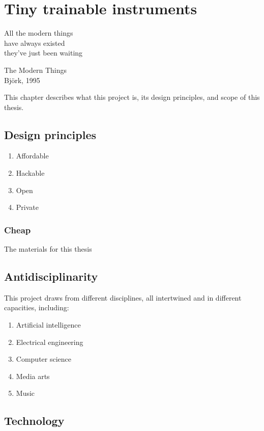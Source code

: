 \chapter{Tiny trainable instruments}

\epigraph{All the modern things \\ have always existed \\ they've just been waiting}{The Modern Things \\ Björk, 1995}

This chapter describes what this project is, its design principles, and scope of this thesis.

\section{Design principles}

\begin{enumerate}
  \item Affordable
  \item Hackable
  \item Open
  \item Private
\end{enumerate}

\subsection{Cheap}

The materials for this thesis 

\section{Antidisciplinarity}

This project draws from different disciplines, all intertwined and in different capacities, including:

\begin{enumerate}
  \item Artificial intelligence
  \item Electrical engineering
  \item Computer science
  \item Media arts
  \item Music
\end{enumerate}

\section{Technology}

